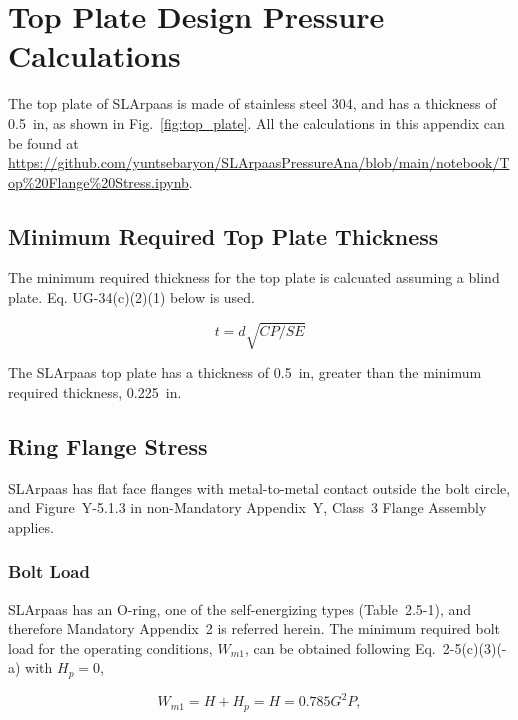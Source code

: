 \section{Top Plate Design Pressure Calculations}
\label{app:top_plate}

The top plate of SLArpaas is made of stainless steel 304, and has
a thickness of 0.5~in, as shown in Fig.~\ref{fig:top_plate}.
All the calculations in this appendix can be found
at \url{https://github.com/yuntsebaryon/SLArpaasPressureAna/blob/main/notebook/Top%20Flange%20Stress.ipynb}.

\subsection{Minimum Required Top Plate Thickness}
\label{app:blind_flange}

The minimum required thickness for the top plate is calcuated assuming
a blind plate.  Eq. UG-34(c)(2)(1) below is used.

\begin{equation}
    t= d\sqrt{CP/SE}
\end{equation}



The SLArpaas top plate has a thickness of 0.5~in, greater than the minimum
required thickness, 0.225~in.

\subsection{Ring Flange Stress}
\label{app:ring_flange}

SLArpaas has flat face flanges with metal-to-metal contact outside the bolt
circle, and Figure~Y-5.1.3 in non-Mandatory Appendix~Y, Class~3 Flange Assembly
applies.

\subsubsection{Bolt Load}
\label{app:bolt_load}

SLArpaas has an O-ring, one of the self-energizing types (Table~2.5-1),
and therefore Mandatory Appendix~2 is referred herein.
The minimum required bolt load for the operating conditions,
$W_{m1}$, can be obtained following Eq.~2-5(c)(3)(-a) with $H_p = 0$,

\begin{equation}
    W_{m1} = H + H_p = H = 0.785G^2 P,
\end{equation}

